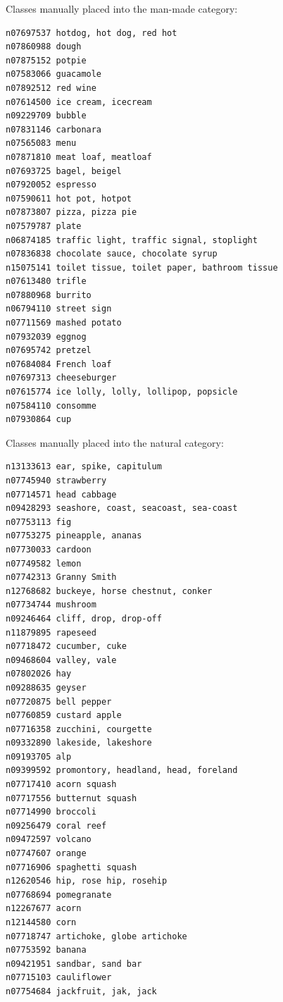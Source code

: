 \pagebreak

Classes manually placed into the man-made category:
{
\scriptsize
\begin{verbatim}
n07697537 hotdog, hot dog, red hot
n07860988 dough
n07875152 potpie
n07583066 guacamole
n07892512 red wine
n07614500 ice cream, icecream
n09229709 bubble
n07831146 carbonara
n07565083 menu
n07871810 meat loaf, meatloaf
n07693725 bagel, beigel
n07920052 espresso
n07590611 hot pot, hotpot
n07873807 pizza, pizza pie
n07579787 plate
n06874185 traffic light, traffic signal, stoplight
n07836838 chocolate sauce, chocolate syrup
n15075141 toilet tissue, toilet paper, bathroom tissue
n07613480 trifle
n07880968 burrito
n06794110 street sign
n07711569 mashed potato
n07932039 eggnog
n07695742 pretzel
n07684084 French loaf
n07697313 cheeseburger
n07615774 ice lolly, lolly, lollipop, popsicle
n07584110 consomme
n07930864 cup
\end{verbatim}
}

Classes manually placed into the natural category:

{
\scriptsize
\begin{verbatim}
n13133613 ear, spike, capitulum
n07745940 strawberry
n07714571 head cabbage
n09428293 seashore, coast, seacoast, sea-coast
n07753113 fig
n07753275 pineapple, ananas
n07730033 cardoon
n07749582 lemon
n07742313 Granny Smith
n12768682 buckeye, horse chestnut, conker
n07734744 mushroom
n09246464 cliff, drop, drop-off
n11879895 rapeseed
n07718472 cucumber, cuke
n09468604 valley, vale
n07802026 hay
n09288635 geyser
n07720875 bell pepper
n07760859 custard apple
n07716358 zucchini, courgette
n09332890 lakeside, lakeshore
n09193705 alp
n09399592 promontory, headland, head, foreland
n07717410 acorn squash
n07717556 butternut squash
n07714990 broccoli
n09256479 coral reef
n09472597 volcano
n07747607 orange
n07716906 spaghetti squash
n12620546 hip, rose hip, rosehip
n07768694 pomegranate
n12267677 acorn
n12144580 corn
n07718747 artichoke, globe artichoke
n07753592 banana
n09421951 sandbar, sand bar
n07715103 cauliflower
n07754684 jackfruit, jak, jack
\end{verbatim}
}
